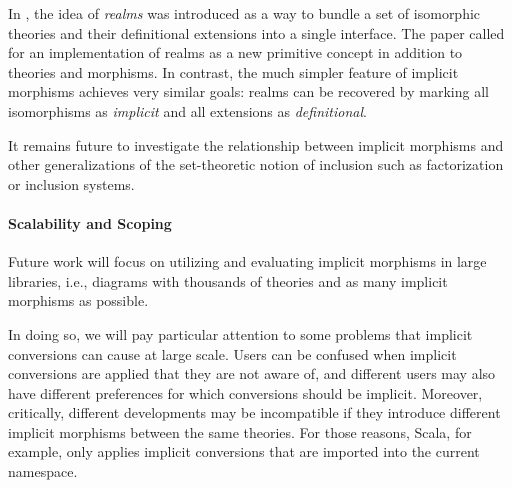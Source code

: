 In \cite{realms}, the idea of \emph{realms} was introduced as a way to bundle a set of isomorphic theories and their definitional extensions into a single interface.
The paper called for an implementation of realms as a new primitive concept in addition to theories and morphisms.
In contrast, the much simpler feature of implicit morphisms achieves very similar goals: realms can be recovered by marking all isomorphisms as \emph{implicit} and all extensions as \emph{definitional}.

It remains future to investigate the relationship between implicit morphisms and other generalizations of the set-theoretic notion of inclusion such as factorization or inclusion systems.

%

\paragraph{Scalability and Scoping}
Future work will focus on utilizing and evaluating implicit morphisms in large libraries, i.e., diagrams with thousands of theories and as many implicit morphisms as possible.

In doing so, we will pay particular attention to some problems that implicit conversions can cause at large scale.
Users can be confused when implicit conversions are applied that they are not aware of, and different users may also have different preferences for which conversions should be implicit.
Moreover, critically, different developments may be incompatible if they introduce different implicit morphisms between the same theories.
For those reasons, Scala, for example, only applies implicit conversions that are imported into the current namespace.

